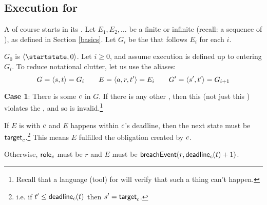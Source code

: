 \documentclass[12pt]{article}
\begin{document}
%


\subsection{Execution for \FSContracts} \label{fscontractexec}
A \FSContract of course starts in its \startstate. Let $E_1, E_2, \dots$ be a finite or infinite \trace (recall: a sequence of \Events), as defined in Section \ref{basics}. Let $G_i$ be the \GlobalState that follows $E_i$ for each $i$.

$G_0$ is $\tup{\startstate, 0}$.
Let $i \geq 0$, and assume execution is defined up to entering $G_i$. To reduce notational clutter, let us use the aliases:
\[ G = \langle s,t\rangle = G_i  \qquad E = \langle a,r,t'\rangle = E_i \qquad  G' = \langle s',t'\rangle = G_{i+1}\]

{\bf Case 1}: There is some \enabled \mustntran $c$ in $G$. If there is any other \enabled \connection, then this \Contract (not just this \trace) violates the \uaoc, and so is invalid.\footnote{Recall that a language (tool) for \FSContracts will verify that such a thing can't happen.}
\begin{PPI}
    \item If $E$ is \compatible with $c$ and $E$ happens within $c$'s deadline, then the next state must be $\textsf{target}_{c}$.\footnote{i.e. if $t' \leq \textsf{deadline}_{c}(t)$ then $s' = \textsf{target}_{c}$.} This means $E$ fulfilled the obligation created by $c$.
        \item Otherwise, $\textsf{role}_{e}$ must be $r$ and $E$ must be $\textsf{breachEvent}(r,\textsf{deadline}_{c}(t) + 1)$. %
\end{PPI}
\end{document}
